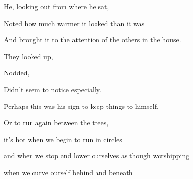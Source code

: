 \documentclass[11pt]{article}
\begin{document}
\vspace*{4\baselineskip}

\begingroup
\begin{center}
He, looking out from where he sat,
\end{center}
\endgroup

\begingroup
\begin{center}
Noted how much warmer it looked than it was
\end{center}
\endgroup

\begingroup
\begin{center}
And brought it to the attention of the others in the house.
\end{center}
\endgroup

\begingroup
\begin{center}
They looked up,
\end{center}
\endgroup

\begingroup
\begin{center}
Nodded,
\end{center}
\endgroup

\begingroup
\begin{center}
Didn't seem to notice especially.
\end{center}
\endgroup

\begingroup
\begin{center}
Perhaps this was his sign to keep things to himself,
\end{center}
\endgroup

\begingroup
\begin{center}
Or to run again between the trees,
\end{center}
\endgroup

\vspace*{2\baselineskip}

\begingroup
\begin{center}
it's hot when we begin to run in circles
\rightskip\leftskip
\end{center}
\endgroup

\begingroup
\begin{center}
and when we stop and lower ourselves as though worshipping
\rightskip\leftskip
\end{center}
\endgroup

\begingroup
\begin{center}
when we curve ourself behind and beneath
\rightskip\leftskip
\end{center}
\endgroup
\end{document}
